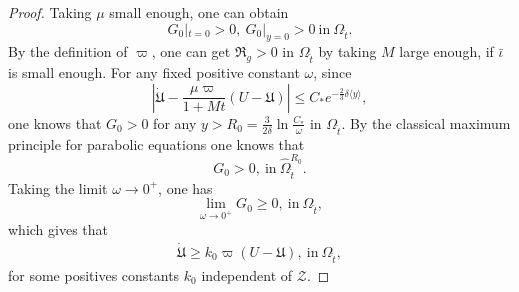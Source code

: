 \documentclass{amsart}
\numberwithin{equation}{section}
\newcommand\y{{{\langle y \rangle}}}
\begin{document}
\begin{proof}
Taking $\mu$ small enough, one can obtain
$$G_{0}|_{t=0}>0,~G_{0}|_{y=0}>0~\text{in}~\Omega_{\hat{t}}.$$
By the definition of $\varpi$, one can get $\mathfrak{R}_{g}>0$ in $\Omega_{\hat{t}}$ by taking $M$ large enough, if $\bar{\iota}$ is small enough.
For any fixed positive constant $\omega$, since
$$\left|\dot{\mathfrak{U}}-\frac{\mu\varpi}{1+Mt}(U-\mathfrak{U})\right|\leq C_{*}e^{-\frac{2}{3}\delta\y},$$
one knows that $G_{0}>0$ for any $y>R_{0}=\frac{3}{2\delta}\ln{\frac{C_{*}}{\omega}}$ in $\Omega_{\hat{t}}$.
By the classical maximum principle for parabolic equations one knows that
$$G_{0}>0,~\text{in}~\hat{\Omega}_{\hat{t}}^{R_{0}}.$$
Taking the limit $\omega\to 0^{+}$, one has
 $$\lim\limits_{\omega\to 0^{+}}G_{0}\geq 0,~\text{in}~\Omega_{\hat{t}},$$
which gives that
\begin{align}\label{dotu01g}
\dot{\mathfrak{U}}\geq k_{0}\varpi(U-\mathfrak{U}),~\text{in}~\Omega_{\hat{t}},
\end{align}
for some positives constants $k_{0}$ independent of $\mathcal{Z}$.


\end{proof}
\end{document}
